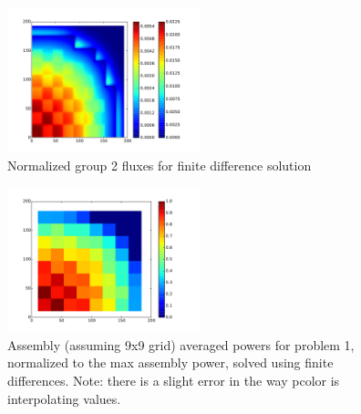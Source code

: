 \documentclass[12pt]{article}
\newenvironment{solnum}[2][Solution]{\begin{trivlist}
\item[\hskip \labelsep {\bfseries #1}\hskip \labelsep {\bfseries #2:}]\hspace{0.3in}\newline\newline}{\end{trivlist}}
\begin{document}
\begin{solnum}{1-1}
\begin{figure}
    \centering
    \caption{Normalized group 2 fluxes for finite difference solution}
    \includegraphics[width=0.5\textwidth]{prob1_diff_g2.pdf}
\end{figure}

\begin{figure}
    \centering
    \caption{Assembly (assuming 9x9 grid) averaged powers for problem 1, normalized
    to the max assembly power, solved using finite differences. Note: there is a slight error in the way pcolor is interpolating values.}
    \includegraphics[width=0.5\textwidth]{powers_diff.pdf}
\end{figure}

\end{solnum}
\clearpage
\end{document}
